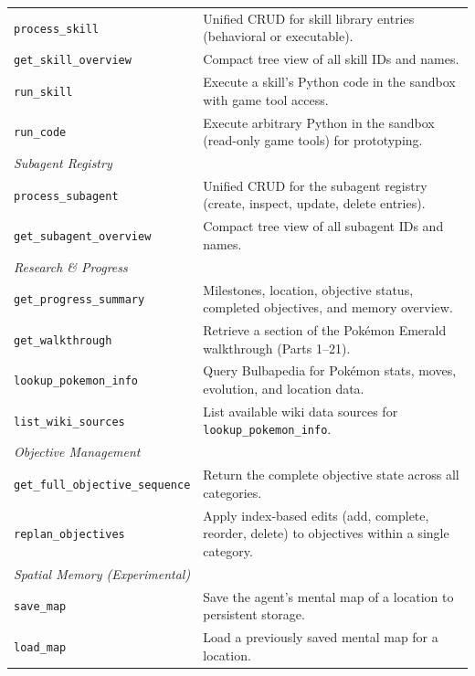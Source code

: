 \begin{table}[h]
\begin{tabular}{l p{9.5cm}}
\texttt{process\_skill}          & Unified CRUD for skill library entries (behavioral or executable). \\
\texttt{get\_skill\_overview}    & Compact tree view of all skill IDs and names. \\
\texttt{run\_skill}              & Execute a skill's Python code in the sandbox with game tool access. \\
\texttt{run\_code}               & Execute arbitrary Python in the sandbox (read-only game tools) for prototyping. \\
\midrule
\multicolumn{2}{l}{\textit{Subagent Registry}} \\
\texttt{process\_subagent}       & Unified CRUD for the subagent registry (create, inspect, update, delete entries). \\
\texttt{get\_subagent\_overview} & Compact tree view of all subagent IDs and names. \\
\midrule
\multicolumn{2}{l}{\textit{Research \& Progress}} \\
\texttt{get\_progress\_summary}  & Milestones, location, objective status, completed objectives, and memory overview. \\
\texttt{get\_walkthrough}        & Retrieve a section of the Pok\'{e}mon Emerald walkthrough (Parts 1--21). \\
\texttt{lookup\_pokemon\_info}   & Query Bulbapedia for Pok\'{e}mon stats, moves, evolution, and location data. \\
\texttt{list\_wiki\_sources}     & List available wiki data sources for \texttt{lookup\_pokemon\_info}. \\
\midrule
\multicolumn{2}{l}{\textit{Objective Management}} \\
\texttt{get\_full\_objective\_sequence} & Return the complete objective state across all categories. \\
\texttt{replan\_objectives}      & Apply index-based edits (add, complete, reorder, delete) to objectives within a single category. \\
\midrule
\multicolumn{2}{l}{\textit{Spatial Memory (Experimental)}} \\
\texttt{save\_map}               & Save the agent's mental map of a location to persistent storage. \\
\texttt{load\_map}               & Load a previously saved mental map for a location. \\
\bottomrule
\end{tabular}
\end{table}


